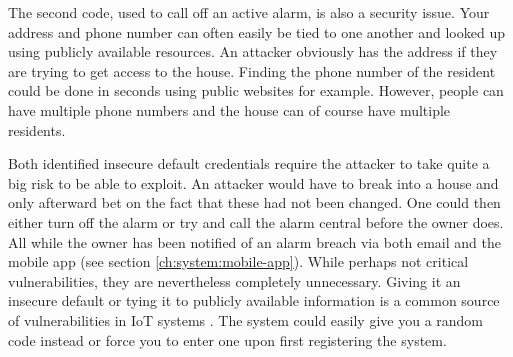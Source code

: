 The second code, used to call off an active alarm, is also a security issue. Your address and phone number can often easily be tied to one another and looked up using publicly available resources. An attacker obviously has the address if they are trying to get access to the house. Finding the phone number of the resident could be done in seconds using public websites for example. However, people can have multiple phone numbers and the house can of course have multiple residents.

Both identified insecure default credentials require the attacker to take quite a big risk to be able to exploit. An attacker would have to break into a house and only afterward bet on the fact that these had not been changed. One could then either turn off the alarm or try and call the alarm central before the owner does. All while the owner has been notified of an alarm breach via both email and the mobile app (see section \ref{ch:system:mobile-app}). While perhaps not critical vulnerabilities, they are nevertheless completely unnecessary. Giving it an insecure default or tying it to publicly available information is a common source of vulnerabilities in IoT systems \cite{owasp-iot-top10, etsi-iot-standard}. The system could easily give you a random code instead or force you to enter one upon first registering the system.
